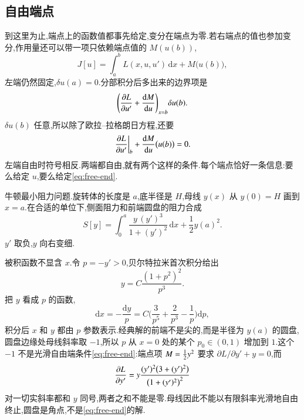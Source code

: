 \subsection{自由端点}
到这里为止,端点上的函数值都事先给定,变分在端点为零.若右端点的值也参加变分,作用量还可以带一项只依赖端点值的 $M(u(b))$,
\begin{equation}
  J[u]=\int_a^b L(x,u,u')\,\mathrm{d}x+M\bigl(u(b)\bigr),
\end{equation}
左端仍然固定,$\delta u(a)=0$.分部积分后多出来的边界项是
\begin{equation}
  \Biggl(\frac{\partial{L}}{\partial{u'}}+\frac{\mathrm{d}M}{\mathrm{d}u}\Biggr)_{x=b}\delta u(b).
\end{equation}
$\delta u(b)$ 任意,所以除了欧拉--拉格朗日方程,还要
\begin{equation}
  \left.\frac{\partial{L}}{\partial{u'}}\right|_{b}+\frac{\mathrm{d}M}{\mathrm{d}u}\bigl(u(b)\bigr)=0.
  \label{eq:free-end}
\end{equation}
左端自由时符号相反.两端都自由,就有两个这样的条件.每个端点恰好一条信息:要么给定 $u$,要么给定\eqref{eq:free-end}.

\begin{example}
牛顿最小阻力问题.旋转体的长度是 $a$,底半径是 $H$,母线 $y(x)$ 从 $y(0)=H$ 画到 $x=a$.在合适的单位下,侧面阻力和前端圆盘的阻力合成
\begin{equation}
  S[y]=\int_0^a \frac{y\,(y')^3}{1+(y')^2}\,\mathrm{d}x+\frac12 y(a)^2.
\end{equation}
$y'$ 取负,$y$ 向右变细.
\end{example}
\begin{solution}
被积函数不显含 $x$.令 $p=-y'>0$,贝尔特拉米首次积分给出
\begin{equation}
  y=C\frac{(1+p^2)^2}{p^3}.
\end{equation}
把 $y$ 看成 $p$ 的函数,
\begin{equation}
  \mathrm{d}x=-\frac{\mathrm{d}y}{p}
  =C\Biggl(\frac{3}{p^5}+\frac{2}{p^3}-\frac{1}{p}\Biggr)\mathrm{d}p,
\end{equation}
积分后 $x$ 和 $y$ 都由 $p$ 参数表示.经典解的前端不是尖的,而是半径为 $y(a)$ 的圆盘,圆盘边缘处母线斜率取 $-1$,所以 $p$ 从 $x=0$ 处的某个 $p_0\in(0,1)$ 增加到 $1$.这个 $-1$ 不是光滑自由端条件\eqref{eq:free-end}:端点项 $M={\frac{1}{2}} y^2$ 要求 $\partial L/\partial y'+y=0$,而
\begin{equation}
  \frac{\partial{L}}{\partial{y'}}=y\frac{(y')^2\bigl(3+(y')^2\bigr)}{\bigl(1+(y')^2\bigr)^2}
\end{equation}
对一切实斜率都和 $y$ 同号,两者之和不能是零.母线因此不能以有限斜率光滑地自由终止,圆盘是角点,不是\eqref{eq:free-end}的解.
\end{solution}

